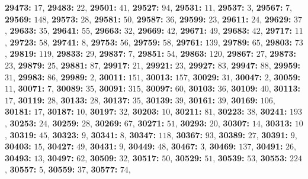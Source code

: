 \textsf{\bfseries 29473:} $17$, \textsf{\bfseries 29483:} $22$, \textsf{\bfseries 29501:} $41$, \textsf{\bfseries 29527:} $94$, \textsf{\bfseries 29531:} $11$, \textsf{\bfseries 29537:} $3$, \textsf{\bfseries 29567:} $7$, \textsf{\bfseries 29569:} $148$, \textsf{\bfseries 29573:} $28$, \textsf{\bfseries 29581:} $50$, \textsf{\bfseries 29587:} $36$, \textsf{\bfseries 29599:} $23$, \textsf{\bfseries 29611:} $24$, \textsf{\bfseries 29629:} $37$, \textsf{\bfseries 29633:} $35$, \textsf{\bfseries 29641:} $55$, \textsf{\bfseries 29663:} $32$, \textsf{\bfseries 29669:} $42$, \textsf{\bfseries 29671:} $49$, \textsf{\bfseries 29683:} $42$, \textsf{\bfseries 29717:} $11$, \textsf{\bfseries 29723:} $58$, \textsf{\bfseries 29741:} $8$, \textsf{\bfseries 29753:} $56$, \textsf{\bfseries 29759:} $58$, \textsf{\bfseries 29761:} $139$, \textsf{\bfseries 29789:} $65$, \textsf{\bfseries 29803:} $73$, \textsf{\bfseries 29819:} $119$, \textsf{\bfseries 29833:} $29$, \textsf{\bfseries 29837:} $7$, \textsf{\bfseries 29851:} $54$, \textsf{\bfseries 29863:} $120$, \textsf{\bfseries 29867:} $27$, \textsf{\bfseries 29873:} $23$, \textsf{\bfseries 29879:} $25$, \textsf{\bfseries 29881:} $87$, \textsf{\bfseries 29917:} $21$, \textsf{\bfseries 29921:} $23$, \textsf{\bfseries 29927:} $83$, \textsf{\bfseries 29947:} $88$, \textsf{\bfseries 29959:} $31$, \textsf{\bfseries 29983:} $86$, \textsf{\bfseries 29989:} $2$, \textsf{\bfseries 30011:} $151$, \textsf{\bfseries 30013:} $157$, \textsf{\bfseries 30029:} $31$, \textsf{\bfseries 30047:} $2$, \textsf{\bfseries 30059:} $11$, \textsf{\bfseries 30071:} $7$, \textsf{\bfseries 30089:} $35$, \textsf{\bfseries 30091:} $315$, \textsf{\bfseries 30097:} $60$, \textsf{\bfseries 30103:} $36$, \textsf{\bfseries 30109:} $40$, \textsf{\bfseries 30113:} $17$, \textsf{\bfseries 30119:} $28$, \textsf{\bfseries 30133:} $28$, \textsf{\bfseries 30137:} $35$, \textsf{\bfseries 30139:} $39$, \textsf{\bfseries 30161:} $39$, \textsf{\bfseries 30169:} $106$, \textsf{\bfseries 30181:} $17$, \textsf{\bfseries 30187:} $10$, \textsf{\bfseries 30197:} $32$, \textsf{\bfseries 30203:} $10$, \textsf{\bfseries 30211:} $81$, \textsf{\bfseries 30223:} $38$, \textsf{\bfseries 30241:} $193$, \textsf{\bfseries 30253:} $24$, \textsf{\bfseries 30259:} $28$, \textsf{\bfseries 30269:} $67$, \textsf{\bfseries 30271:} $51$, \textsf{\bfseries 30293:} $20$, \textsf{\bfseries 30307:} $14$, \textsf{\bfseries 30313:} $10$, \textsf{\bfseries 30319:} $45$, \textsf{\bfseries 30323:} $9$, \textsf{\bfseries 30341:} $8$, \textsf{\bfseries 30347:} $118$, \textsf{\bfseries 30367:} $93$, \textsf{\bfseries 30389:} $27$, \textsf{\bfseries 30391:} $9$, \textsf{\bfseries 30403:} $15$, \textsf{\bfseries 30427:} $49$, \textsf{\bfseries 30431:} $9$, \textsf{\bfseries 30449:} $48$, \textsf{\bfseries 30467:} $3$, \textsf{\bfseries 30469:} $137$, \textsf{\bfseries 30491:} $26$, \textsf{\bfseries 30493:} $13$, \textsf{\bfseries 30497:} $62$, \textsf{\bfseries 30509:} $32$, \textsf{\bfseries 30517:} $50$, \textsf{\bfseries 30529:} $51$, \textsf{\bfseries 30539:} $53$, \textsf{\bfseries 30553:} $224$, \textsf{\bfseries 30557:} $5$, \textsf{\bfseries 30559:} $37$, \textsf{\bfseries 30577:} $74$, 
